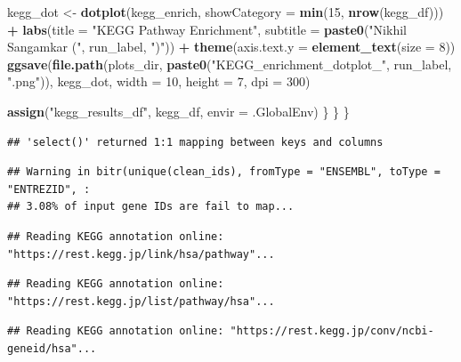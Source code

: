 \documentclass[
]{article}
\newenvironment{Shaded}{\begin{snugshade}}{\end{snugshade}}
\newcommand{\AttributeTok}[1]{\textcolor[rgb]{0.13,0.29,0.53}{#1}}
\newcommand{\DecValTok}[1]{\textcolor[rgb]{0.00,0.00,0.81}{#1}}
\newcommand{\FunctionTok}[1]{\textcolor[rgb]{0.13,0.29,0.53}{\textbf{#1}}}
\newcommand{\NormalTok}[1]{#1}
\newcommand{\OtherTok}[1]{\textcolor[rgb]{0.56,0.35,0.01}{#1}}
\newcommand{\SpecialCharTok}[1]{\textcolor[rgb]{0.81,0.36,0.00}{\textbf{#1}}}
\newcommand{\StringTok}[1]{\textcolor[rgb]{0.31,0.60,0.02}{#1}}
\begin{document}
\begin{Shaded}
\begin{Highlighting}[]
\NormalTok{      kegg\_dot }\OtherTok{\textless{}{-}} \FunctionTok{dotplot}\NormalTok{(kegg\_enrich, }\AttributeTok{showCategory =} \FunctionTok{min}\NormalTok{(}\DecValTok{15}\NormalTok{, }\FunctionTok{nrow}\NormalTok{(kegg\_df))) }\SpecialCharTok{+}
        \FunctionTok{labs}\NormalTok{(}\AttributeTok{title =} \StringTok{"KEGG Pathway Enrichment"}\NormalTok{, }\AttributeTok{subtitle =} \FunctionTok{paste0}\NormalTok{(}\StringTok{"Nikhil Sangamkar ("}\NormalTok{, run\_label, }\StringTok{")"}\NormalTok{)) }\SpecialCharTok{+}
        \FunctionTok{theme}\NormalTok{(}\AttributeTok{axis.text.y =} \FunctionTok{element\_text}\NormalTok{(}\AttributeTok{size =} \DecValTok{8}\NormalTok{))}
      \FunctionTok{ggsave}\NormalTok{(}\FunctionTok{file.path}\NormalTok{(plots\_dir, }\FunctionTok{paste0}\NormalTok{(}\StringTok{"KEGG\_enrichment\_dotplot\_"}\NormalTok{, run\_label, }\StringTok{".png"}\NormalTok{)),}
\NormalTok{             kegg\_dot, }\AttributeTok{width =} \DecValTok{10}\NormalTok{, }\AttributeTok{height =} \DecValTok{7}\NormalTok{, }\AttributeTok{dpi =} \DecValTok{300}\NormalTok{)}

      \FunctionTok{assign}\NormalTok{(}\StringTok{"kegg\_results\_df"}\NormalTok{, kegg\_df, }\AttributeTok{envir =}\NormalTok{ .GlobalEnv)}
\NormalTok{    \}}
\NormalTok{  \}}
\NormalTok{\}}
\end{Highlighting}
\end{Shaded}

\begin{verbatim}
## 'select()' returned 1:1 mapping between keys and columns
\end{verbatim}

\begin{verbatim}
## Warning in bitr(unique(clean_ids), fromType = "ENSEMBL", toType = "ENTREZID", :
## 3.08% of input gene IDs are fail to map...
\end{verbatim}

\begin{verbatim}
## Reading KEGG annotation online: "https://rest.kegg.jp/link/hsa/pathway"...
\end{verbatim}

\begin{verbatim}
## Reading KEGG annotation online: "https://rest.kegg.jp/list/pathway/hsa"...
\end{verbatim}

\begin{verbatim}
## Reading KEGG annotation online: "https://rest.kegg.jp/conv/ncbi-geneid/hsa"...
\end{verbatim}
\end{document}
